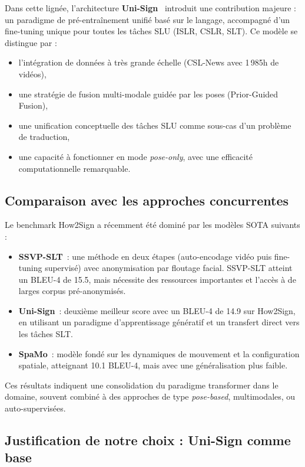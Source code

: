 Dans cette lignée, l’architecture \textbf{Uni-Sign}~\cite{li2025unisign} introduit une contribution majeure : un paradigme de pré-entraînement unifié basé sur le langage, accompagné d’un fine-tuning unique pour toutes les tâches SLU (ISLR, CSLR, SLT). Ce modèle se distingue par :
\begin{itemize}
    \item l’intégration de données à très grande échelle (CSL-News avec 1\,985h de vidéos),
    \item une stratégie de fusion multi-modale guidée par les poses (Prior-Guided Fusion),
    \item une unification conceptuelle des tâches SLU comme sous-cas d’un problème de traduction,
    \item une capacité à fonctionner en mode \textit{pose-only}, avec une efficacité computationnelle remarquable.
\end{itemize}

\subsection*{Comparaison avec les approches concurrentes}

Le benchmark How2Sign a récemment été dominé par les modèles SOTA suivants :
\begin{itemize}
    \item \textbf{SSVP-SLT}~\cite{rust2024ssvp}: une méthode en deux étapes (auto-encodage vidéo puis fine-tuning supervisé) avec anonymisation par floutage facial. SSVP-SLT atteint un BLEU-4 de 15.5, mais nécessite des ressources importantes et l’accès à de larges corpus pré-anonymisés.
    \item \textbf{Uni-Sign}~\cite{li2025unisign}: deuxième meilleur score avec un BLEU-4 de 14.9 sur How2Sign, en utilisant un paradigme d’apprentissage génératif et un transfert direct vers les tâches SLT.
    \item \textbf{SpaMo}~\cite{spamo2024}: modèle fondé sur les dynamiques de mouvement et la configuration spatiale, atteignant 10.1 BLEU-4, mais avec une généralisation plus faible.
\end{itemize}

Ces résultats indiquent une consolidation du paradigme transformer dans le domaine, souvent combiné à des approches de type \textit{pose-based}, multimodales, ou auto-supervisées.

\subsection*{Justification de notre choix : Uni-Sign comme base}

